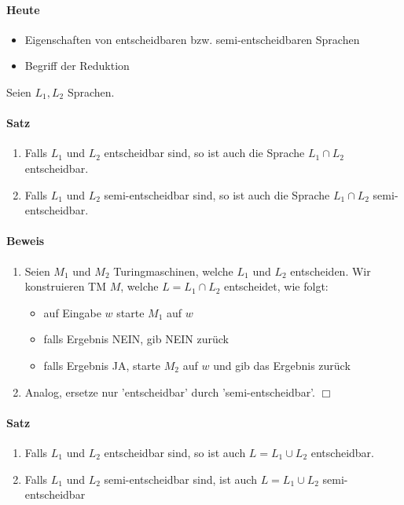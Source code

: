 \paragraph*{Heute}
\begin{itemize}
	\item Eigenschaften von entscheidbaren bzw. semi-entscheidbaren Sprachen
	\item Begriff der Reduktion
\end{itemize}

Seien $L_1,L_2$ Sprachen.
\paragraph*{Satz}
\begin{enumerate}
	\item Falls $L_1$ und $L_2$ entscheidbar sind, so ist auch die Sprache $L_1 \cap L_2$ entscheidbar.
	\item Falls $L_1$ und $L_2$ semi-entscheidbar sind, so ist auch die Sprache $L_1 \cap L_2$  semi-entscheidbar.
\end{enumerate}

\paragraph*{Beweis}
\begin{enumerate}
	\item Seien $M_1$ und $M_2$ Turingmaschinen, welche $L_1$ und $L_2$ entscheiden. Wir konstruieren TM $M$, welche $L=L_1\cap L_2$ entscheidet, wie folgt:
	\begin{itemize}
		\item auf Eingabe $w$ starte $M_1$ auf $w$
		\item falls Ergebnis NEIN, gib NEIN zurück
		\item falls Ergebnis JA, starte $M_2$ auf $w$ und gib das Ergebnis zurück
	\end{itemize}
	\item Analog, ersetze nur 'entscheidbar' durch 'semi-entscheidbar'. $\Box$
\end{enumerate}

\paragraph*{Satz}
\begin{enumerate}
	\item Falls $L_1$ und $L_2$ entscheidbar sind, so ist auch $L=L_1 \cup L_2$ entscheidbar.
	\item Falls $L_1$ und $L_2$ semi-entscheidbar sind, ist auch $L=L_1 \cup L_2$ semi-entscheidbar
\end{enumerate}

